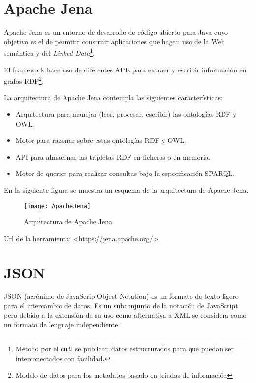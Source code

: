\section{Apache Jena}

Apache Jena es un entorno de desarrollo de código abierto para Java cuyo objetivo es el de permitir construir aplicaciones que hagan uso de la Web semántica y del \textit{Linked Data}\footnote{Método por el cuál se publican datos estructurados para que puedan ser interconectados con facilidad.}. 

El framework hace uso de diferentes APIs para extraer y escribir información en grafos RDF\footnote{Modelo de datos para los metadatos basado en triadas de información}.\cite{wiki:jena}

La arquitectura de Apache Jena contempla las siguientes características:

\begin{itemize}
	\item{Arquitectura para manejar (leer, procesar, escribir) las ontologías RDF y OWL.}
	\item{Motor para razonar sobre estas ontologías RDF y OWL.}
	\item{API para almacenar las tripletas RDF en ficheros o en memoria.}
	\item{Motor de queries para realizar consultas bajo la especificación SPARQL.}\cite{jena}
\end{itemize}

En la siguiente figura se muestra un esquema de la arquitectura de Apache Jena.



\begin{figure}[tph]
    \begin{center}%
          \begin{center}%
            \texttt{[image: ApacheJena]}%
            \caption{Arquitectura de Apache Jena}%
            \label{figJena}%
          \end{center}%
    \end{center}%
  \end{figure}%

Url de la herramienta: \url{<https://jena.apache.org/>}

\newpage
\section{JSON}

JSON (acrónimo de JavaScrip Object Notation) es un formato de texto ligero para el intercambio de datos. Es un subconjunto de la notación de JavaScript pero debido a la extensión de su uso como alternativa a XML se considera como un formato de lenguaje independiente.

